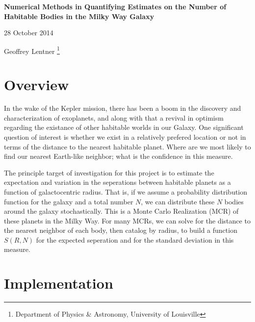 \documentclass[10pt,a4paper,final]{article}
\begin{document}
	\begin{flushleft}
		\par{\Large{\textbf{Numerical Methods in Quantifying Estimates on
							the Number of Habitable Bodies in the Milky Way Galaxy}}\par}
	\end{flushleft}

	\bigskip

	\begin{center}
		\par{28 October 2014\par}
		\bigskip
		\par{Geoffrey Lentner
		\footnote{Department of Physics \& Astronomy, University of Louisville}
		\par}
	\end{center}

	\vspace*{\baselineskip}

	\section{Overview}

		In the wake of the Kepler mission, there has been a boom in the discovery
		and characterization of exoplanets, and along with that a revival in optimism
		regarding the existance of other habitable worlds in our Galaxy. One significant
		question of interest is whether we exist in a relatively prefered location or
		not in terms of the distance to the nearest habitable planet. Where are
		we most likely to find our nearest Earth-like neighbor; what is the confidence
		in this measure.
		
		The principle target of investigation for this project is to estimate
		the expectation and variation in the seperations between habitable planets
		as a function of galactocentric radius. That is, if we assume a probability
		distribution function for the galaxy and a total number $N$, we can distribute
		these $N$ bodies around the galaxy stochastically. This is a Monte Carlo
		Realization (MCR) of these planets in the Milky Way. For many MCRs, we can
		solve for the distance to the nearest neighbor of each body, then catalog
		by radius, to build a function $S(R,N)$ for the expected seperation and
		for the standard deviation in this measure.

	
	\section{Implementation}
\end{document}
